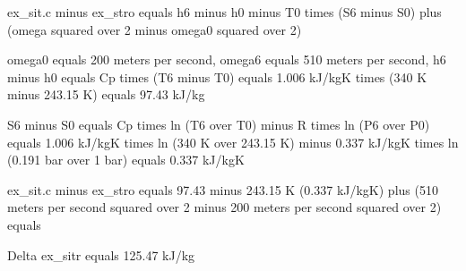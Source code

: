 ex_sit.c minus ex_stro equals h6 minus h0 minus T0 times (S6 minus S0) plus (omega squared over 2 minus omega0 squared over 2)

omega0 equals 200 meters per second, omega6 equals 510 meters per second, h6 minus h0 equals Cp times (T6 minus T0) equals 1.006 kJ/kgK times (340 K minus 243.15 K) equals 97.43 kJ/kg

S6 minus S0 equals Cp times ln (T6 over T0) minus R times ln (P6 over P0) equals 1.006 kJ/kgK times ln (340 K over 243.15 K) minus 0.337 kJ/kgK times ln (0.191 bar over 1 bar) equals 0.337 kJ/kgK

ex_sit.c minus ex_stro equals 97.43 minus 243.15 K (0.337 kJ/kgK) plus (510 meters per second squared over 2 minus 200 meters per second squared over 2) equals

Delta ex_sitr equals 125.47 kJ/kg